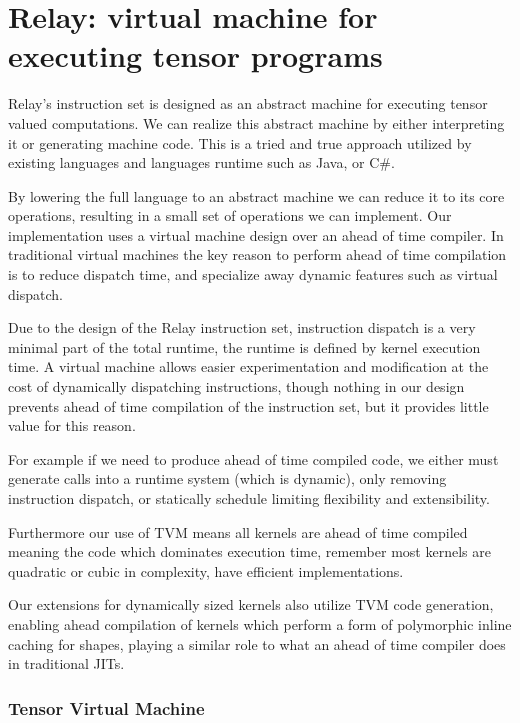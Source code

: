 \chapter{Relay: virtual machine for executing tensor programs}
\label{ch:dynamic}

Relay's instruction set is designed as an abstract machine for executing tensor valued
computations. We can realize this abstract machine by either interpreting it or generating
machine code. This is a tried and true approach utilized by existing languages and languages
runtime such as Java, or C\#.

By lowering the full language to an abstract machine we can reduce it to its core operations,
resulting in a small set of operations we can implement. Our implementation uses a virtual
machine design over an ahead of time compiler. In traditional virtual machines the key
reason to perform ahead of time compilation is to reduce dispatch time, and specialize
away dynamic features such as virtual dispatch.

Due to the design of the Relay instruction set, instruction dispatch is a very minimal
part of the total runtime, the runtime is defined by kernel execution time.
A virtual machine allows easier experimentation and modification at the cost of dynamically
dispatching instructions, though nothing in our design prevents ahead of time compilation
of the instruction set, but it provides little value for this reason.

For example if we need to produce ahead of time
compiled code, we either must generate calls into a runtime system (which is dynamic),
only removing instruction dispatch, or statically schedule limiting flexibility and
extensibility.

Furthermore our use of TVM means all kernels are ahead of time compiled meaning the
code which dominates execution time, remember most kernels are quadratic or cubic in
complexity, have efficient implementations.

Our extensions for dynamically sized kernels also utilize TVM code generation, enabling
ahead compilation of kernels which perform a form of polymorphic inline caching for shapes,
playing a similar role to what an ahead of time compiler does in traditional JITs.



\subsection{Tensor Virtual Machine}

